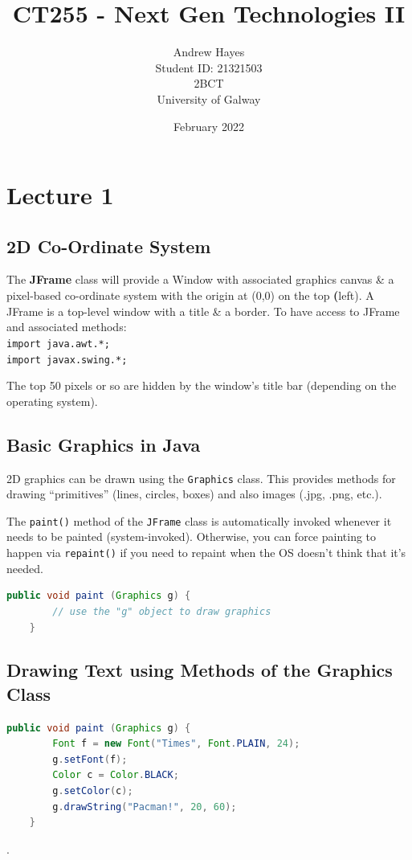 \documentclass[11pt]{article}
\title{CT255 - Next Gen Technologies II}
\author{Andrew Hayes\\
\AND
Student ID: 21321503\\
\AND
\AND
\AND
\AND
	2BCT\\
\AND
    University of Galway\\
}
\date{February 2022}
\begin{document}
\maketitle

\newpage
\tableofcontents
\thispagestyle{empty}


\newpage
\setcounter{page}{1}
\section{Lecture 1}
\subsection{2D Co-Ordinate System}
The \textbf{JFrame} class will provide a Window with associated graphics canvas \& a pixel-based
co-ordinate system with the origin at (0,0) on the top \textbf(left). 
A JFrame is a top-level window with a title \& a border. 
To have access to JFrame and associated methods:
\\
\verb|import java.awt.*;|   \\
\verb|import javax.swing.*;|


The top 50 pixels or so are hidden by the window's title bar (depending on the operating system).

\subsection{Basic Graphics in Java}
2D graphics can be drawn using the \verb|Graphics| class. 
This provides methods for drawing ``primitives'' (lines, circles, boxes) and also images (.jpg, .png, etc.). 

The \verb|paint()| method of the \verb|JFrame| class is automatically invoked whenever it needs to be 
painted (system-invoked). 
Otherwise, you can force painting to happen via \verb|repaint()| if you need to repaint when the OS
doesn't think that it's needed.

\begin{lstlisting}[language=Java]
    public void paint (Graphics g) {
        // use the "g" object to draw graphics
    }
\end{lstlisting}

\subsection{Drawing Text using Methods of the Graphics Class}
\begin{lstlisting}[language=Java]
    public void paint (Graphics g) {
        Font f = new Font("Times", Font.PLAIN, 24);
        g.setFont(f);
        Color c = Color.BLACK;
        g.setColor(c);
        g.drawString("Pacman!", 20, 60);
    }
\end{lstlisting}.
\end{document}
